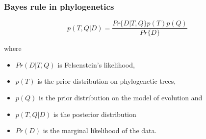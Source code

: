 \begin{frame}
\frametitle{Bayes rule in phylogenetics}

\LARGE{
\[
p(T,Q|D) = \frac{Pr\{D|T,Q\}p(T)p(Q)}{Pr\{D\}}
\]
}

\normalsize{
where 

\begin{itemize}
\item $Pr(D|T,Q)$ is \alert{Felsenstein's likelihood}, 
\item $p(T)$ is the \alert{prior} distribution on phylogenetic trees,
\item $p(Q)$ is the \alert{prior} distribution on the model of evolution and
\item $p(T,Q|D)$ is the \alert{posterior} distribution
\item $Pr(D)$ is the \alert{marginal likelihood} of the data.
\end{itemize}
}

\end{frame}

